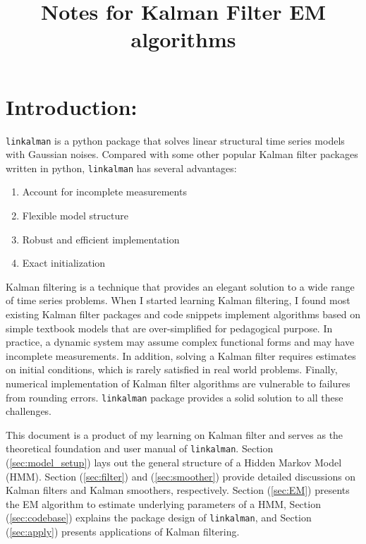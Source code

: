 \documentclass[12pt]{article}
\newenvironment{boenumerate}
    {\begin{enumerate}\renewcommand\labelenumi{\textbf\theenumi}}
    {\end{enumerate}}
\numberwithin{equation}{section}
\begin{document}
\title{Notes for Kalman Filter EM algorithms}

\section{Introduction:}
\texttt{linkalman} is a python package that solves linear structural time series models with Gaussian noises. Compared with some other popular Kalman filter packages written in python, \texttt{linkalman} has several advantages:
\begin{boenumerate}
    \item Account for incomplete measurements 
    \item Flexible model structure
    \item Robust and efficient implementation
    \item Exact initialization
\end{boenumerate}
Kalman filtering is a technique that provides an elegant solution to a wide range of time series problems. When I started learning Kalman filtering, I found most existing Kalman filter packages and code snippets implement algorithms based on simple textbook models that are over-simplified for pedagogical purpose. In practice, a dynamic system may assume complex functional forms and may have incomplete measurements. In addition, solving a Kalman filter requires estimates on initial conditions, which is rarely satisfied in real world problems. Finally, numerical implementation of Kalman filter algorithms are vulnerable to failures from rounding errors. \texttt{linkalman} package provides a solid solution to all these challenges. 

This document is a product of my learning on Kalman filter and serves as the theoretical foundation and user manual of \texttt{linkalman}. Section (\ref{sec:model_setup}) lays out the general structure of a Hidden Markov Model (HMM). Section (\ref{sec:filter}) and (\ref{sec:smoother}) provide detailed discussions on Kalman filters and Kalman smoothers, respectively. Section (\ref{sec:EM}) presents the EM algorithm to estimate underlying parameters of a HMM, Section (\ref{sec:codebase}) explains the package design of \texttt{linkalman}, and Section (\ref{sec:apply}) presents applications of Kalman filtering. 
\end{document}

